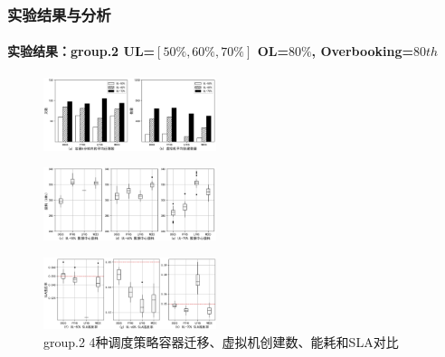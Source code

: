 \begin{frame}
\frametitle{实验结果与分析}
\framesubtitle{实验结果：group.2 \textbf{UL=$[50\%,60\%,70\%]$ OL=$80\%$, Overbooking=$80th$}}
\begin{minipage}{\textwidth}
    \centering
    \begin{figure}[htb]
    \centering
    \includegraphics[width=0.45\textwidth]{figures/fig16_4-5_a.png}
    \end{figure}
\end{minipage}
\begin{minipage}{\textwidth}
    \centering
    \begin{figure}[htb]
    \centering
    \includegraphics[width=0.45\textwidth]{figures/fig16_4-5_b.png}
    \end{figure}
\end{minipage}
\begin{minipage}{\textwidth}
    \centering
    \begin{figure}[htb]
    \centering
    \includegraphics[width=0.45\textwidth]{figures/fig16_4-5_c.png}
    \caption{group.2 4种调度策略容器迁移、虚拟机创建数、能耗和SLA对比}
    \label{fig:fig16}
    \end{figure}
\end{minipage}
\end{frame}

